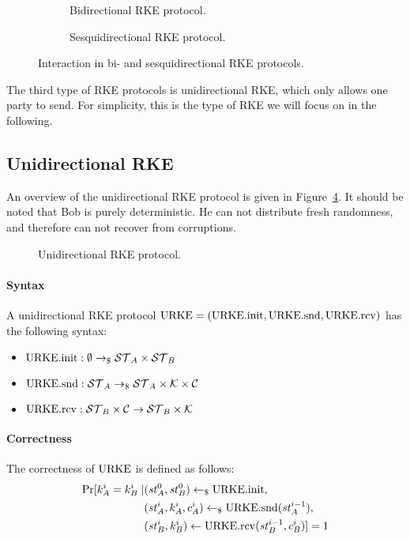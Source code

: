 \begin{figure}[!ht]
    \centering
    \begin{subfigure}{.5\textwidth}
        \centering
        
        \caption{Bidirectional RKE protocol.}
        \label{fig:RKE:bi}
    \end{subfigure}\hfill
    \begin{subfigure}{.5\textwidth}
        \centering
        
        \caption{Sesquidirectional RKE protocol.}
        \label{fig:RKE:sesq}
    \end{subfigure}
    \caption{Interaction in bi- and sesquidirectional RKE protocols.}
\end{figure}

The third type of RKE protocols is unidirectional RKE, which only allows one party to send.
For simplicity, this is the type of RKE we will focus on in the following.

\subsection{Unidirectional RKE}

An overview of the unidirectional RKE protocol is given in Figure~\ref{fig:rke:uni}.
It should be noted that Bob is purely deterministic.
He can not distribute fresh randomness, and therefore can not recover from corruptions.

\begin{figure}[!ht]
    \centering
    
    \caption{Unidirectional RKE protocol.}
    \label{fig:rke:uni}
\end{figure}

\paragraph{Syntax} A unidirectional RKE protocol $\mathrm{URKE}=(\mathrm{URKE}.\mathrm{init}, \mathrm{URKE}.\mathrm{snd}, \mathrm{URKE}.\mathrm{rcv})$ has the following syntax:

\begin{itemize}
    \item $\mathrm{URKE}.\mathrm{init}: \emptyset\to_\$\mathcal{ST}_A\times\mathcal{ST}_B$
    \item $\mathrm{URKE}.\mathrm{snd}: \mathcal{ST}_A\to_\$\mathcal{ST}_A\times\mathcal{K}\times\mathcal{C}$
    \item $\mathrm{URKE}.\mathrm{rcv}: \mathcal{ST}_B\times\mathcal{C}\to\mathcal{ST}_B\times\mathcal{K}$
\end{itemize}

\paragraph{Correctness} The correctness of $\mathrm{URKE}$ is defined as follows:
\begin{align*} %
    \Pr[k_A^i=k_B^i\mid &(\st_A^0, \st_B^0)\getsr\URKEinit, \\
                        &(\st_A^i, k_A^i, c_A^i)\getsr\URKEsnd(\st_A^{i-1}), \\
                        &(\st_B^i, k_B^i)\gets\URKErcv(\st_B^{i-1}, c_B^i)] = 1
\end{align*}

